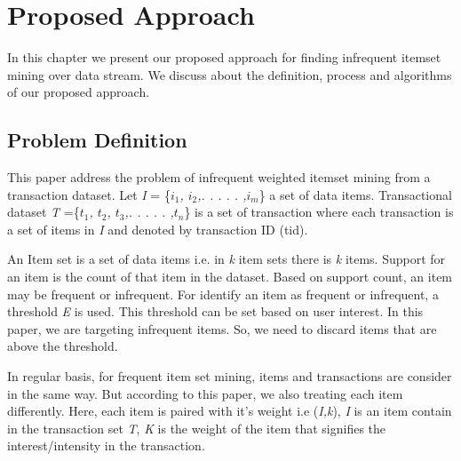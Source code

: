 
\chapter{Proposed Approach} %
\label{Chapter 3}
In this chapter we present our proposed approach for finding infrequent itemset mining over data stream. We discuss about the definition, process and algorithms of our proposed approach. 
%
%
%
\section{Problem Definition}
%
This paper address the problem of infrequent weighted itemset mining from a transaction dataset. Let {\it I} = \{{\it $i_1$, $i_2$,. . . . . ,$i_m$}\} a set of data items. Transactional dataset {\it T} =\{{\it $t_1$, $t_2$, $t_3$,. . . . . ,$t_n$}\} is a set of transaction where each transaction is a set of items in {\it I} and denoted by transaction ID (tid). 

An Item set is a set of data items i.e. in {\it k} item sets there is {\it k} items.  Support for an item is the count of that item in the dataset. Based on support count, an item may be frequent or infrequent. For identify an item as frequent or infrequent, a threshold {\it E} is used. This threshold can be set based on user interest. In this paper, we are targeting infrequent items. So, we need to discard items that are above the threshold. 

In regular basis, for frequent item set mining, items and transactions are consider in the same way. But \cite{cagliero2014infrequent} according to this paper, we also treating each item differently. Here, each item is paired with it’s weight i.e ({\it I,k}), {\it I} is an item contain in the transaction set {\it T}, {\it K} is the weight of the item that signifies the interest/intensity in the transaction.

